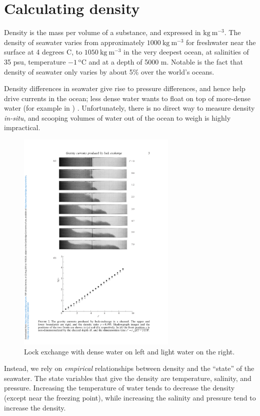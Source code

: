 \section{Calculating density}

Density is the mass per volume of a substance, and expressed in $\mathrm{kg\ m^{-3}}$.  The density of seawater varies from approximately $1000\ \mathrm{kg\ m^{-3}}$ for freshwater near the surface at 4 degrees C, to $1050\ \mathrm{kg\ m^{-3}}$ in the very deepest ocean, at salinities of 35 psu, temperature $-1\ \mathrm{^oC}$ and at a depth of 5000 m.  Notable is the fact that density of seawater only varies by about 5\% over the world's oceans.  

Density differences in seawater give rise to pressure differences, and hence help drive currents in the ocean; less dense water wants to float on top of more-dense water (for example in ) .  Unfortunately, there is no direct way to measure density \emph{in-situ}, and scooping volumes of water out of the ocean to weigh is highly impractical.

\begin{figure}[htbp]
    \includegraphics[width=3in]{./figs/ShinEtAl04Fig2.pdf}
    \caption{Lock exchange with dense water on left and light water on the right. \citep{Shinetal04}}
     \label{fig:lock-exchange}  
\end{figure}

Instead, we rely on \emph{empirical} relationships between density and the ``state'' of the seawater.  The state variables that give the density are  temperature, salinity, and pressure.  Increasing the temperature of water tends to decrease the density (except near the freezing point), while increasing the salinity and pressure tend to increase the density.  


